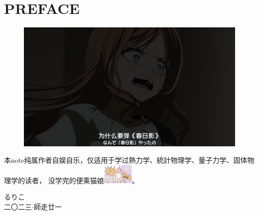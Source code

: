 \chapter*{PREFACE}

\begin{figure}[ht]
    \centering
    \includegraphics[width=\linewidth]{haruhikage.png}
    \label{fig:preface_haruhikage}
\end{figure}

本note纯属作者自娱自乐，仅适用于学过熱力学、統計物理学、量子力学、固体物理学的读者，\vspace{1ex}
没学完的便乘猫娘\includegraphics[width=4em,align=c]{idiot.jpg}。

\begin{flushright}
	るりこ \\
	二〇二三$\cdot$師走廿一\\
\end{flushright}

